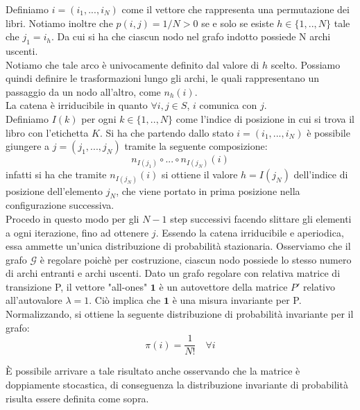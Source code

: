 \documentclass[
	12pt, %
]{fphw}
\begin{document}
Definiamo $i = (i_1, ... , i_N)$ come il vettore che rappresenta una permutazione dei libri. Notiamo inoltre che $p(i,j)=1/N>0$ se e solo se esiste $h\in \{1,..,N\}$ tale che
$j_1 = i_h$. Da cui si ha che ciascun nodo nel grafo indotto possiede N archi uscenti.\\
Notiamo che tale arco è univocamente definito dal valore di $h$ scelto.
Possiamo quindi definire le trasformazioni lungo gli archi, le quali rappresentano un passaggio da un nodo all'altro, come $n_h(i)$.\\
La catena è irriducibile in quanto $\forall i,j \in S$, $i$ comunica con $j$.\\
Definiamo $I(k)$ per ogni $k \in \{1,..,N\}$ come l'indice di posizione in cui si trova il libro con l'etichetta $K$.
Si ha che partendo dallo stato $i = (i_1, ... , i_N)$ è possibile giungere a $j = (j_1, ... , j_N)$ tramite la seguente composizione:
\begin{equation}
	n_{I(j_1)} \circ ... \circ n_{I(j_N)} (i)
\end{equation}
infatti si ha che tramite $n_{I(j_N)} (i)$ si ottiene il valore $h = I(j_N)$ dell'indice di posizione dell'elemento $j_N$, che viene portato in prima posizione nella configurazione successiva.\\
Procedo in questo modo per gli $N-1$ step successivi facendo slittare gli elementi a ogni iterazione, fino ad ottenere $j$.
Essendo la catena irriducibile e aperiodica, essa ammette un'unica distribuzione di probabilità stazionaria.
Osserviamo che il grafo $\mathcal{G}$ è regolare poichè per costruzione, ciascun nodo possiede lo stesso numero di archi entranti e archi uscenti.
Dato un grafo regolare con relativa matrice di transizione P, il vettore "all-ones" $\mathbf{1}$ è un autovettore della matrice $P'$ relativo all'autovalore $\lambda = 1$.
Ciò implica che $\mathbf{1}$ è una misura invariante per P. Normalizzando, si ottiene la seguente distribuzione di probabilità invariante per il grafo:
\begin{equation*}
	\pi(i) = \frac{1}{N!} \quad \forall i
\end{equation*}
	
\MakeUppercase{è} possibile arrivare a tale risultato anche osservando che la matrice è doppiamente stocastica, di conseguenza la distribuzione invariante di probabilità risulta essere definita come sopra.\\



\end{document}
